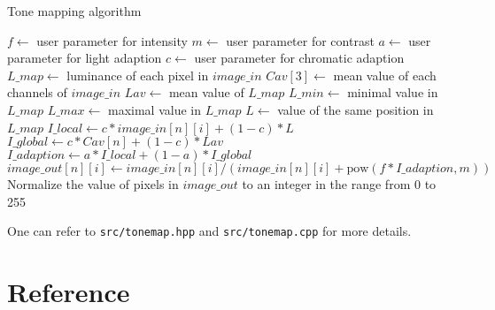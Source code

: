\documentclass[11pt]{article}
\begin{document}
\begin{algorithm}
\caption{Tone mapping algorithm \cite{ref:tone-map}}\label{euclid}
\begin{algorithmic}[1]
\State $f\gets$ user parameter for intensity
\State $m\gets$ user parameter for contrast
\State $a\gets$ user parameter for light adaption 
\State $c\gets$ user parameter for chromatic adaption
\State $L\_map\gets$ luminance of each pixel in $image\_in$
\State $Cav[3]\gets$ mean value of each channels of $image\_in$
\State $Lav\gets$ mean value of $L\_map$
\State $L\_min\gets$ minimal value in $L\_map$
\State $L\_max\gets$ maximal value in $L\_map$
\State $L\gets$ value of the same position in $L\_map$
\State $I\_local\gets c* image\_in[n][i]+ (1-c)*L$
\State $I\_global\gets c*Cav[n]+ (1-c)* Lav$
\State $I\_adaption\gets a*I\_local+(1-a)*I\_global$
\State $image\_out[n][i]\gets image\_in[n][i]/(image\_in[n][i]+\mbox{pow}(f*I\_adaption, m))$
\EndFor
\EndFor
\State Normalize the value of pixels in $image\_out$ to an integer in the range from 0 to 255
\EndFunction
\end{algorithmic}
\end{algorithm}

One can refer to \texttt{src/tonemap.hpp} and \texttt{src/tonemap.cpp} for more details.


\begin{figure}[!ht]
	\centering
	\label{distort}
\end{figure}

\section{Reference}


\end{document}
